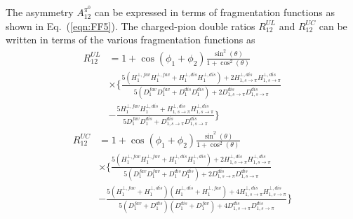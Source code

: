 The asymmetry $A_{12}^{\pi^0}$ can be expressed in terms of fragmentation functions as shown in Eq.~(\ref{eqn:FF5}). %
The charged-pion double ratios $R^{UL}_{12}$ and $R^{UC}_{12}$ can be written in terms of the various fragmentation functions as
%
\begin{equation}
\begin{aligned}
R^{UL}_{12}&=1+\cos(\phi_1+\phi_2)\frac{\sin^2(\theta)}{1+\cos^2(\theta)}\\
&\times\bigg\{\frac{5(H^{\bot,fav}_1H^{\bot,fav}_1+H^{\bot,dis}_1H^{\bot,dis}_1)+2H^{\bot,dis}_{1,s\rightarrow\pi}H^{\bot,dis}_{1,s\rightarrow\pi}}{5(D^{fav}_1D^{fav}_1+D^{dis}_1 D^{dis}_1)+2D^{dis}_{1,s\rightarrow\pi}D^{dis}_{1,s\rightarrow\pi}}\\
&-\frac{5H^{\bot,fav}_1 H^{\bot,dis}_1+H^{\bot,dis}_{1,s\rightarrow\pi}H^{\bot,dis}_{1,s\rightarrow\pi}}{5D^{fav}_1D^{dis}_1 +D^{dis}_{1,s\rightarrow\pi}D^{dis}_{1,s\rightarrow\pi}} \bigg\} 
\end{aligned}
\label{eqn:allratiosexpress2}
\end{equation}
\begin{equation}
\begin{aligned}
R^{UC}_{12}&=1+\cos(\phi_1+\phi_2)\frac{\sin^2(\theta)}{1+\cos^2(\theta)}\\
&\times\bigg\{\frac{5(H^{\bot,fav}_1H^{\bot,fav}_1+H^{\bot,dis}_1H^{\bot,dis}_1)+2H^{\bot,dis}_{1,s\rightarrow\pi}H^{\bot,dis}_{1,s\rightarrow\pi}}{5(D^{fav}_1D^{fav}_1+D^{dis}_1D^{dis}_1)+2D^{dis}_{1,s\rightarrow\pi}D^{dis}_{1,s\rightarrow\pi}}\\
&-\frac{5(H^{\bot,fav}_1+H^{\bot,dis}_1)(H^{\bot,dis}_1+H^{\bot,fav}_1)+4H^{\bot,dis}_{1,s\rightarrow\pi}H^{\bot,dis}_{1,s\rightarrow\pi}}{5(D^{fav}_1+D^{dis}_1)(D^{dis}_1+D^{fav}_1)+4D^{dis}_{1,s\rightarrow\pi}D^{dis}_{1,s\rightarrow\pi}} \bigg\}
\end{aligned}
\label{eqn:allratiosexpress3}
\end{equation}

